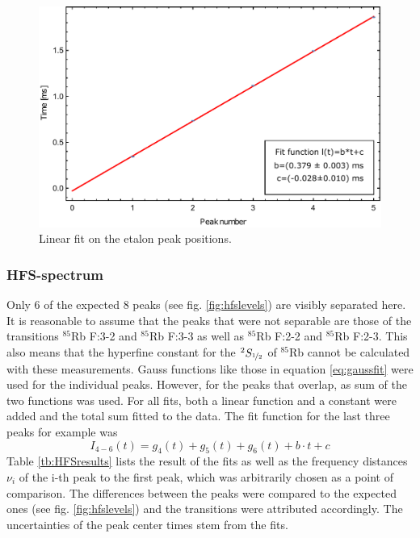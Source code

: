 \begin{figure}[htb]
\centering
\includegraphics[width=1.0\linewidth]{graphics/ethalon_linearfit}
\caption[Lienear fit on etalon peak positions]{Linear fit on the etalon peak positions.}
\label{fig:ethalon_linearfit}
\end{figure}

\subsubsection*{HFS-spectrum}
Only 6 of the expected 8 peaks (see fig. \ref{fig:hfslevels}) are visibly separated here. It is reasonable to assume that the peaks that were not separable are those of the transitions $^{85}$Rb F:3-2 and $^{85}$Rb F:3-3 as well as $^{85}$Rb F:2-2 and $^{85}$Rb F:2-3. This also means that the hyperfine constant for the $^2S_{\nicefrac{1}{2}}$ of $^{85}$Rb cannot be calculated with these measurements.
Gauss functions like those in equation \ref{eq:gaussfit} were used for the individual peaks. However, for the peaks that overlap, as sum of the two functions was used. For all fits, both a linear function and a constant were added and the total sum fitted to the data. The fit function for the last three peaks for example was
\begin{equation}
I_{4-6}(t)=g_4(t)+g_5(t)+g_6(t)+b\cdot t+c
\end{equation}
Table \ref{tb:HFSresults} lists the result of the fits as well as the frequency distances $\nu_{i}$ of the i-th peak to the first peak, which was arbitrarily chosen as a point of comparison. The differences between the peaks were compared to the expected ones (see fig. \ref{fig:hfslevels}) and the transitions were attributed accordingly. The uncertainties of the peak center times stem from the fits.\\

